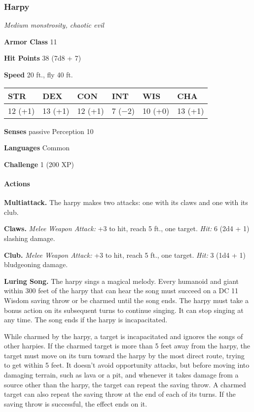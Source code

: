 \documentclass[
]{article}
\begin{document}
\hypertarget{harpy}{%
\subsubsection{Harpy}\label{harpy}}

\emph{Medium monstrosity, chaotic evil}

\textbf{Armor Class} 11

\textbf{Hit Points} 38 (7d8 + 7)

\textbf{Speed} 20 ft., fly 40 ft.

\begin{longtable}[]{@{}llllll@{}}
\toprule
STR & DEX & CON & INT & WIS & CHA\tabularnewline
\midrule
\endhead
12 (+1) & 13 (+1) & 12 (+1) & 7 (−2) & 10 (+0) & 13 (+1)\tabularnewline
\bottomrule
\end{longtable}

\textbf{Senses} passive Perception 10

\textbf{Languages} Common

\textbf{Challenge} 1 (200 XP)

\hypertarget{actions-4}{%
\paragraph{Actions}\label{actions-4}}

\textbf{Multiattack.} The harpy makes two attacks: one with its claws
and one with its club.

\textbf{Claws.} \emph{Melee Weapon Attack:} +3 to hit, reach 5 ft., one
target. \emph{Hit:} 6 (2d4 + 1) slashing damage.

\textbf{Club.} \emph{Melee Weapon Attack:} +3 to hit, reach 5 ft., one
target. \emph{Hit:} 3 (1d4 + 1) bludgeoning damage.

\textbf{Luring Song.} The harpy sings a magical melody. Every humanoid
and giant within 300 feet of the harpy that can hear the song must
succeed on a DC 11 Wisdom saving throw or be charmed until the song
ends. The harpy must take a bonus action on its subsequent turns to
continue singing. It can stop singing at any time. The song ends if the
harpy is incapacitated.

While charmed by the harpy, a target is incapacitated and ignores the
songs of other harpies. If the charmed target is more than 5 feet away
from the harpy, the target must move on its turn toward the harpy by the
most direct route, trying to get within 5 feet. It doesn't avoid
opportunity attacks, but before moving into damaging terrain, such as
lava or a pit, and whenever it takes damage from a source other than the
harpy, the target can repeat the saving throw. A charmed target can also
repeat the saving throw at the end of each of its turns. If the saving
throw is successful, the effect ends on it.
\end{document}
